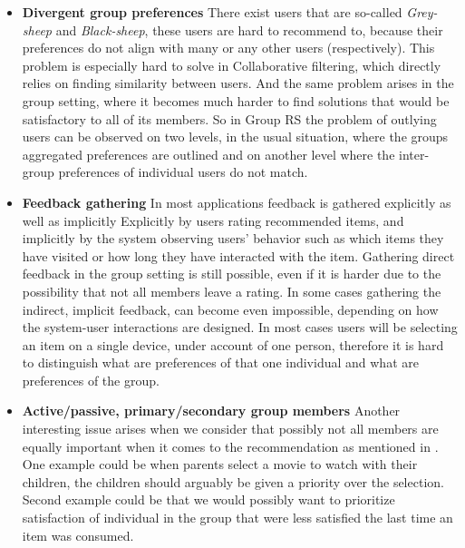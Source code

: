 \begin{itemize}
    \item \textbf{Divergent group preferences} \newline
        There exist users that are so-called \textit{Grey-sheep} and \textit{Black-sheep}, these users are hard to recommend to, because their preferences do not align with many or any other users (respectively). This problem is especially hard to solve in Collaborative filtering, which directly relies on finding similarity between users. And the same problem arises in the group setting, where it becomes much harder to find solutions that would be satisfactory to all of its members. So in Group RS the problem of outlying
        users can be observed on two levels, in the usual situation, where the groups aggregated preferences are outlined and on another level where the inter-group preferences of individual users do not match.
    \item \textbf{Feedback gathering} \newline
        In most applications feedback is gathered explicitly as well as implicitly %
        Explicitly by users rating recommended items, and implicitly by the system observing users' behavior such as which items they have visited or how long they have interacted with the item. Gathering direct feedback in the group setting is still possible, even if it is harder due to the possibility that not all members leave a rating. In some cases gathering the indirect, implicit feedback, can become even impossible, depending on how the system-user interactions are designed. In most cases users will be selecting an item on a single device, under account of one person, therefore it is hard to distinguish what are preferences of that one individual and what are preferences of the group.
    \item \textbf{Active/passive, primary/secondary group members} \newline
        Another interesting issue arises when we consider that possibly not all members are equally important when it comes to the recommendation as mentioned in \cite{deCampos_2009_managing_uncertanity_in_grouprec}. One example could be when parents select a movie to watch with their children, the children should arguably be given a priority over the selection. Second example could be that we would possibly want to prioritize satisfaction of individual in the group that were less satisfied the last time an item was consumed.
        

\end{itemize}
